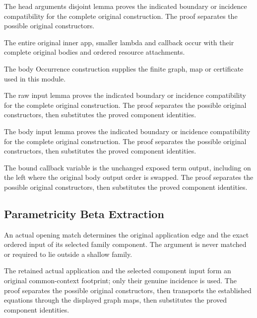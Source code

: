 The head arguments disjoint lemma proves the indicated boundary or incidence compatibility for the complete original construction.
The proof separates the possible original constructors.
\par{}

The entire original inner app, smaller lambda and callback occur with
their complete original bodies and ordered resource attachments.
\par{}

The body Occurrence construction supplies the finite graph, map or certificate used in this module.
\par{}

The raw input lemma proves the indicated boundary or incidence compatibility for the complete original construction.
The proof separates the possible original constructors, then substitutes the proved component identities.
\par{}

The body input lemma proves the indicated boundary or incidence compatibility for the complete original construction.
The proof separates the possible original constructors, then substitutes the proved component identities.
\par{}

The bound callback variable is the unchanged exposed term output,
including on the left where the original body output order is swapped.
The proof separates the possible original constructors, then substitutes the proved component identities.
\par{}

\subsection{Parametricity Beta Extraction}
An actual opening match determines the original application edge and
the exact ordered input of its selected family component. The argument is
never matched or required to lie outside a shallow family.

The retained actual application and the selected component input form
an original common-context footprint; only their genuine incidence is used.
The proof separates the possible original constructors, then transports the established equations through the displayed graph maps, then substitutes the proved component identities.
\par{}

